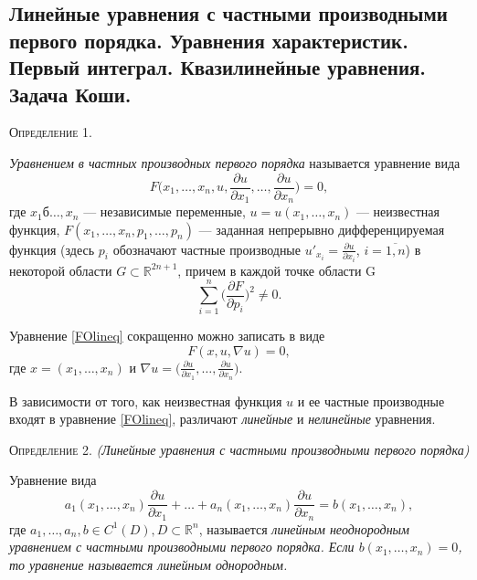 \subsection{Линейные уравнения с частными производными первого порядка. Уравнения характеристик. Первый интеграл. Квазилинейные уравнения. Задача Коши.}
\label{firstorder_lineq}



\textsc{Определение 1.}

\textit{Уравнением в частных производных первого порядка} называется уравнение вида
\begin{equation} \label{FOlineq}
	F\Big(x_1, \dotsc, x_n, u, \frac{\partial u}{\partial x_1}, \dotsc, \frac{\partial u}{\partial x_n}\Big) = 0,
\end{equation}
где $ x_1б \dotsc, x_n $ --- независимые переменные, $ u = u(x_1, \dotsc, x_n) $ --- неизвестная функция, $ F(x_1, \dotsc, x_n, \allowbreak p_1, \dotsc, p_n) $ --- заданная непрерывно дифференцируемая функция (здесь $ p_i $ обозначают частные производные $ u'_{x_i} = \frac{\partial u}{\partial x_i}$, $i = \overline{1, n}$) в некоторой области $ G \subset \mathbb{R}^{2 n + 1}$, причем в каждой точке области G
\begin{equation*}
	\sum \limits_{i = 1}^{n}\Bigg(\frac{\partial F}{\partial p_i}\Bigg)^2 \not = 0.
\end{equation*}  

Уравнение \eqref{FOlineq} сокращенно можно записать в виде 
\begin{equation} \label{FOsimp}
	F(x, u, \nabla u) = 0, \tag{1'}
\end{equation}
где $ x = (x_1, \dotsc, x_n) $ и $\nabla u = \Big(\frac{\partial u}{\partial x_1}, \dotsc, \frac{\partial u}{\partial x_n}\Big)$.


В зависимости от того, как неизвестная функция $ u $ и ее частные производные входят в уравнение \eqref{FOlineq}, различают \textit{линейные} и \textit{нелинейные} уравнения.


\textsc{Определение 2.} \textit{(Линейные уравнения с частными производными первого порядка)}

Уравнение вида 
\begin{equation}
	a_1(x_1, \dotsc, x_n) \frac{\partial u}{\partial x_1} + \dotsc + a_n(x_1, \dotsc, x_n) \frac{\partial u}{\partial x_n} = b(x_1, \dotsc, x_n),
\end{equation}
где $ a_1, \dotsc, a_n, b \in C^1(D), D \subset \mathbb{R}^{n}$, называется \textit{линейным неоднородным уравнением с частными производными первого порядка. Если $ b(x_1, \dotsc, x_n) = 0$, то уравнение называется линейным однородным.}



